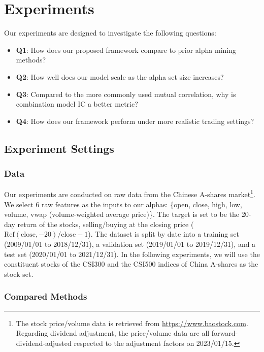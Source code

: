 \section{Experiments}\label{sec:exp}

Our experiments are designed to investigate the following questions:

\begin{itemize}
    \item \textbf{Q1}: How does our proposed framework compare to prior alpha mining methods?
    \item \textbf{Q2}: How well does our model scale as the alpha set size increases?
    \item \textbf{Q3}: Compared to the more commonly used mutual correlation, why is combination model IC a better metric?
    \item \textbf{Q4}: How does our framework perform under more realistic trading settings?
\end{itemize}

\subsection{Experiment Settings}

\subsubsection{Data} \label{sec:data}

Our experiments are conducted on raw data from the Chinese A-shares market\footnote{The stock price/volume data is retrieved from \url{https://www.baostock.com}. Regarding dividend adjustment, the price/volume data are all forward-dividend-adjusted respected to the adjustment factors on 2023/01/15.}. We select 6 raw features as the inputs to our alphas: \{open, close, high, low, volume, vwap (volume-weighted average price)\}. The target is set to be the 20-day return of the stocks, selling/buying at the closing price ($\textrm{Ref}(\textrm{close}, -20) / \textrm{close} - 1$). The dataset is split by date into a training set (2009/01/01 to 2018/12/31), a validation set (2019/01/01 to 2019/12/31), and a test set (2020/01/01 to 2021/12/31). In the following experiments, we will use the constituent stocks of the CSI300 and the CSI500 indices of China A-shares as the stock set.

\subsubsection{Compared Methods}

